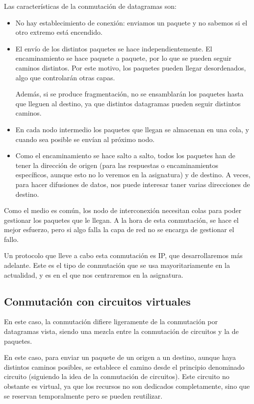Las características de la conmutación de datagramas son:
\begin{itemize}
    \item No hay establecimiento de conexión: enviamos un paquete y no sabemos si el otro extremo está encendido.
    \item El envío de los distintos paquetes se hace independientemente. El encaminamiento se hace paquete a paquete, por lo que se pueden seguir caminos distintos. Por este motivo, los paquetes pueden llegar desordenados, algo que controlarán otras capas.
    
    Además, si se produce fragmentación, no se ensamblarán los paquetes hasta que lleguen al destino, ya que distintos datagramas pueden seguir distintos caminos. 
    \item En cada nodo intermedio los paquetes que llegan se almacenan en una cola, y cuando sea posible se envían al próximo nodo. 
    \item Como el encaminamiento se hace salto a salto, todos los paquetes han de tener la dirección de origen (para las respuestas o encaminamientos específicos, aunque esto no lo veremos en la asignatura) y de destino. A veces, para hacer difusiones de datos, nos puede interesar taner varias direcciones de destino.
\end{itemize}

Como el medio es común, los nodo de interconexión necesitan colas para poder gestionar los paquetes que le llegan.
A la hora de esta conmutación, se hace el mejor esfuerzo, pero si algo falla la capa de red no se encarga de gestionar el fallo.

Un protocolo que lleve a cabo esta conmutación es \acrshort{IP}, que desarrollaremos más adelante.
Este es el tipo de conmutación que se usa mayoritariamente en la actualidad, y es en el que nos centraremos en la asignatura.

\subsection{Conmutación con circuitos virtuales}

En este caso, la conmutación difiere ligeramente de la conmutación por datagramas vista, siendo una mezcla entre la conmutación de circuitos y la de paquetes.

En este caso, para enviar un paquete de un origen a un destino, aunque haya distintos caminos posibles, se establece el camino desde el principio denominado circuito (siguiendo la idea de la conmutación de circuitos). Este circuito no obstante es virtual, ya que los recursos no son dedicados completamente, sino que se reservan temporalmente pero se pueden reutilizar.

